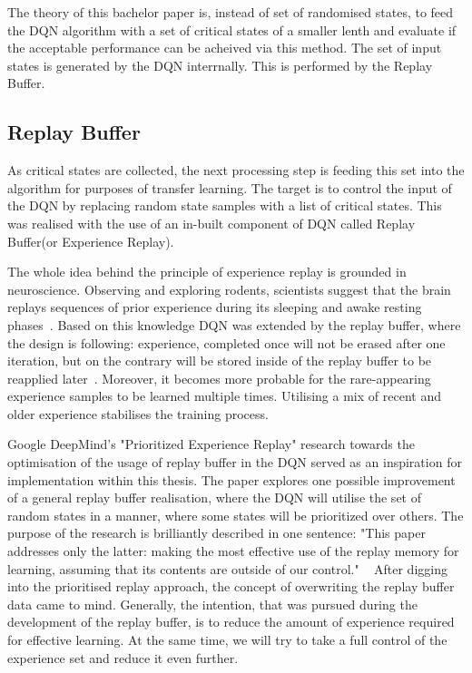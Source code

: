 The theory of this bachelor paper is, instead of set of randomised states, to feed the DQN algorithm with a set of critical states of a smaller lenth and evaluate if the acceptable performance can be acheived via this method. The set of input states is generated by the DQN interrnally. This is performed by the Replay Buffer.

\subsection{Replay Buffer}

As critical states are collected, the next processing step is feeding this set into the algorithm for purposes of transfer learning. The target is to control the input of the DQN by replacing random state samples with a list of critical states. This was realised with the use of an in-built component of DQN called Replay Buffer(or Experience Replay).

The whole idea behind the principle of experience replay is grounded in neuroscience. Observing and exploring rodents, scientists suggest that the brain replays sequences of prior experience during its sleeping and awake resting phases~\cite{Foster2006}. Based on this knowledge DQN was extended by the replay buffer, where the design is following: experience, completed once will not be erased after one iteration, but on the contrary will be stored inside of the replay buffer to be reapplied later~\cite{schaul2016prioritizedexperiencereplay}. Moreover, it becomes more probable for the rare-appearing experience samples to be learned multiple times. Utilising a mix of recent and older experience stabilises the training process.

Google DeepMind's "Prioritized Experience Replay" research towards the optimisation of the usage of replay buffer in the DQN served as an inspiration for implementation within this thesis. The paper explores one possible improvement of a general replay buffer realisation, where the DQN will utilise the set of random states in a manner, where some states will be prioritized over others. The purpose of the research is brilliantly described in one sentence: "This paper addresses only the latter: making the most effective use of the replay memory for learning, assuming that its contents are outside of our control." ~\cite{schaul2016prioritizedexperiencereplay} After digging into the prioritised replay approach, the concept of overwriting the replay buffer data came to mind. Generally, the intention, that was pursued during the development of the replay buffer, is to reduce the amount of experience required for effective learning. At the same time, we will try to take a full control of the experience set and reduce it even further.

